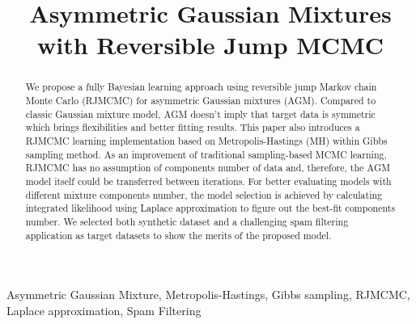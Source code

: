 \documentclass[conference]{IEEEtran}
\begin{document}
\title{Asymmetric Gaussian Mixtures with Reversible Jump MCMC\\
}

\author{
\and
{}
}

\maketitle

\begin{abstract}
We propose a fully Bayesian learning approach using reversible jump Markov  chain Monte Carlo (RJMCMC) for asymmetric Gaussian mixtures (AGM). Compared to classic Gaussian mixture model, AGM doesn't imply that target data is symmetric which brings flexibilities and better fitting results. This paper also introduces a RJMCMC learning implementation based on Metropolis-Hastings (MH) within Gibbs sampling method. As an improvement of traditional sampling-based MCMC learning, RJMCMC has no assumption of components number of data and, therefore, the AGM model itself could be transferred between iterations. For better evaluating models with different mixture components number, the model selection is achieved by calculating integrated likelihood using Laplace approximation to figure out the best-fit components number. We selected both synthetic dataset and a challenging spam filtering application as target datasets to show the merits of the proposed model. 
\end{abstract}

\begin{IEEEkeywords}
Asymmetric Gaussian Mixture, Metropolis-Hastings, Gibbs sampling, RJMCMC, Laplace approximation, Spam Filtering
\end{IEEEkeywords}
\end{document}
